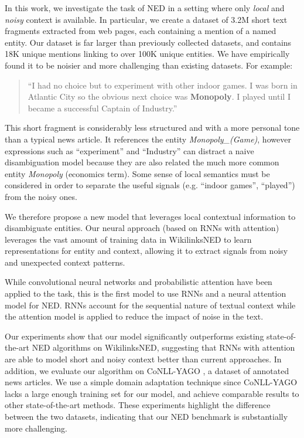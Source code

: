 \documentclass[11pt,letterpaper]{article}
\begin{document}
	In this work, we investigate the task of NED in a setting where only \textit{local} and \textit{noisy} context is available. In particular, we create a dataset of 3.2M short text fragments extracted from web pages, each containing a mention of a named entity. Our dataset is far larger than previously collected datasets, and contains 18K unique mentions linking to over 100K unique entities. We have empirically found it to be noisier and more challenging than existing datasets. For example:
	\begin{quote}
		``I had no choice but to experiment with other indoor games. I was born in Atlantic City so the obvious next choice was \textbf{Monopoly}. I played until I became a successful Captain of Industry.''
	\end{quote}
	This short fragment is considerably less structured and with a more personal tone than a typical news article. It references the entity \textit{Monopoly\_(Game)}, however expressions such as ``experiment'' and ``Industry'' can distract a naive disambiguation model because they are also related the much more common entity \textit{Monopoly} (economics term). Some sense of local semantics must be considered in order to separate the useful signals (e.g. ``indoor games'', ``played'') from the noisy ones.
	
	We therefore propose a new model that leverages local contextual information to disambiguate entities. Our neural approach (based on RNNs with attention) leverages the vast amount of training data in WikilinksNED to learn representations for entity and context, allowing it to extract signals from noisy and unexpected context patterns. 
	
	While convolutional neural networks \cite{sun2015modeling,francis2016capturing} and probabilistic attention \cite{Lazic2015} have been applied to the task, this is the first model to use RNNs and a neural attention model for NED. RNNs account for the sequential nature of textual context while the attention model is applied to reduce the impact of noise in the text. 

	Our experiments show that our model significantly outperforms existing state-of-the-art NED algorithms on WikilinksNED, suggesting that RNNs with attention are able to model short and noisy context better than current approaches. In addition, we evaluate our algorithm on CoNLL-YAGO \cite{hoffart2011robust}, a dataset of annotated news articles. We use a simple domain adaptation technique since CoNLL-YAGO lacks a large enough training set for our model, and achieve comparable results to other state-of-the-art methods. These experiments highlight the difference between the two datasets, indicating that our NED benchmark is substantially more challenging.
	
\end{document}
